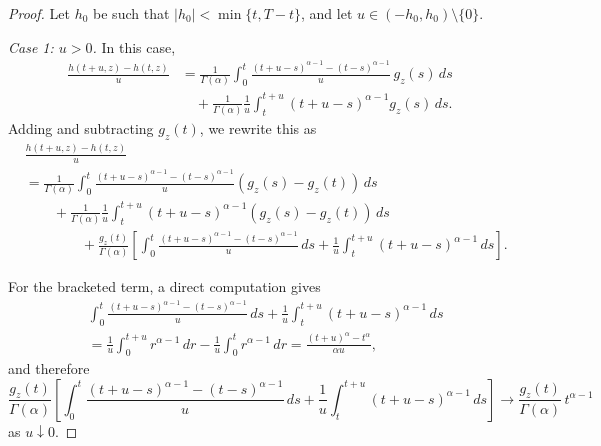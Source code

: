 \documentclass[letterpaper]{article}
\numberwithin{equation}{section}
\theoremstyle{definition}
\theoremstyle{remark}
\begin{document}
\begin{proof}
Let $h_0$ be such that $|h_0|<\min\{t,T-t\}$, and let
$u\in(-h_0,h_0)\setminus\{0\}$.

\smallskip
\noindent
\emph{Case 1: $u>0$.}
In this case,
\begin{align*}
  \frac{h(t+u,z)-h(t,z)}{u}
  &=
  \frac{1}{\Gamma(\alpha)}
  \int_0^t
  \frac{(t+u-s)^{\alpha-1}-(t-s)^{\alpha-1}}{u}\,g_z(s)\,ds
  \\
  &\quad+
  \frac{1}{\Gamma(\alpha)}
  \frac{1}{u}\int_t^{t+u}(t+u-s)^{\alpha-1}g_z(s)\,ds.
\end{align*}
Adding and subtracting $g_z(t)$, we rewrite this as
\begin{align}
  &\frac{h(t+u,z)-h(t,z)}{u}\nonumber\\
  &=
  \frac{1}{\Gamma(\alpha)}
  \int_0^t
  \frac{(t+u-s)^{\alpha-1}-(t-s)^{\alpha-1}}{u}
  \left(g_z(s)-g_z(t)\right)\,ds
  \nonumber\\
  &\qquad+
  \frac{1}{\Gamma(\alpha)}
  \frac{1}{u}\int_t^{t+u}(t+u-s)^{\alpha-1}
  \left(g_z(s)-g_z(t)\right)\,ds
  \nonumber\\
  &\qquad\qquad+
  \frac{g_z(t)}{\Gamma(\alpha)}
  \left[
    \int_0^t
    \frac{(t+u-s)^{\alpha-1}-(t-s)^{\alpha-1}}{u}\,ds
    +
    \frac{1}{u}\int_t^{t+u}(t+u-s)^{\alpha-1}\,ds
  \right].
  \label{eq:dq-split-proof-pos}
\end{align}

For the bracketed term, a direct computation gives
\begin{align*}
  &\int_0^t
    \frac{(t+u-s)^{\alpha-1}-(t-s)^{\alpha-1}}{u}\,ds
    +
    \frac{1}{u}\int_t^{t+u}(t+u-s)^{\alpha-1}\,ds
  \\
  &=
  \frac{1}{u}\int_0^{t+u}r^{\alpha-1}\,dr
  -
  \frac{1}{u}\int_0^t r^{\alpha-1}\,dr
  =
  \frac{(t+u)^\alpha-t^\alpha}{\alpha u},
\end{align*}
and therefore
\begin{equation}\label{eq:bracket-limit-pos}
  \frac{g_z(t)}{\Gamma(\alpha)}
  \left[
    \int_0^t
    \frac{(t+u-s)^{\alpha-1}-(t-s)^{\alpha-1}}{u}\,ds
    +
    \frac{1}{u}\int_t^{t+u}(t+u-s)^{\alpha-1}\,ds
  \right]
  \to
  \frac{g_z(t)}{\Gamma(\alpha)}\,t^{\alpha-1}
\end{equation}
as $u\downarrow0$.


\end{proof}
\end{document}
